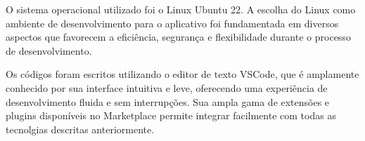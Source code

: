 O sistema operacional utilizado foi o Linux Ubuntu 22. A escolha do Linux como ambiente de desenvolvimento para o aplicativo foi fundamentada em diversos aspectos que favorecem a eficiência, segurança e flexibilidade durante o processo de desenvolvimento. 

Os códigos foram escritos utilizando o editor de texto VSCode, que é amplamente conhecido por sua interface intuitiva e leve, oferecendo uma experiência de desenvolvimento fluida e sem interrupções. Sua ampla gama de extensões e plugins disponíveis no Marketplace permite integrar facilmente com todas as tecnolgias descritas anteriormente.
